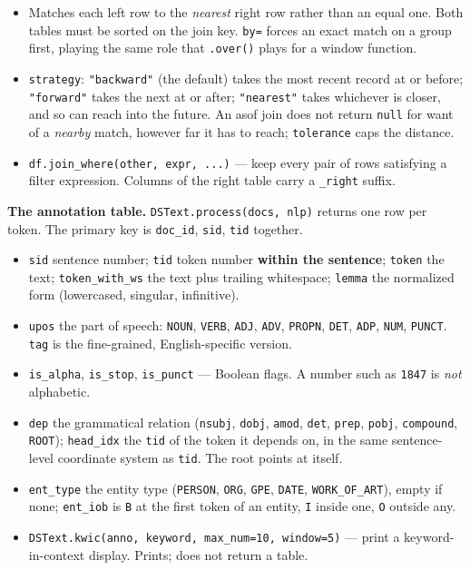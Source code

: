 \documentclass[11pt, a4paper]{article}
\newcommand{\code}[1]{\texttt{#1}}
\begin{document}
\begin{itemize}
  \item Matches each left row to the \textit{nearest} right row rather than an equal one. Both
        tables must be sorted on the join key. \code{by=} forces an exact match on a group
        first, playing the same role that \code{.over()} plays for a window function.
  \item \code{strategy}: \code{"backward"} (the default) takes the most recent record at or
        before; \code{"forward"} takes the next at or after; \code{"nearest"} takes whichever
        is closer, and so can reach into the future. An asof join does not return \code{null}
        for want of a \textit{nearby} match, however far it has to reach; \code{tolerance}
        caps the distance.
  \item \code{df.join\_where(other, expr, ...)} --- keep every pair of rows satisfying a
        filter expression. Columns of the right table carry a \code{\_right} suffix.
\end{itemize}

\smallskip

\textbf{The annotation table.}
\code{DSText.process(docs, nlp)} returns one row per token. The primary key is
\code{doc\_id}, \code{sid}, \code{tid} together.

\begin{itemize}
  \item \code{sid} sentence number; \code{tid} token number \textbf{within the sentence};
        \code{token} the text; \code{token\_with\_ws} the text plus trailing whitespace;
        \code{lemma} the normalized form (lowercased, singular, infinitive).
  \item \code{upos} the part of speech: \code{NOUN}, \code{VERB}, \code{ADJ}, \code{ADV},
        \code{PROPN}, \code{DET}, \code{ADP}, \code{NUM}, \code{PUNCT}. \code{tag} is the
        fine-grained, English-specific version.
  \item \code{is\_alpha}, \code{is\_stop}, \code{is\_punct} --- Boolean flags. A number such as
        \code{1847} is \textit{not} alphabetic.
  \item \code{dep} the grammatical relation (\code{nsubj}, \code{dobj}, \code{amod},
        \code{det}, \code{prep}, \code{pobj}, \code{compound}, \code{ROOT});
        \code{head\_idx} the \code{tid} of the token it depends on, in the same
        sentence-level coordinate system as \code{tid}. The root points at itself.
  \item \code{ent\_type} the entity type (\code{PERSON}, \code{ORG}, \code{GPE},
        \code{DATE}, \code{WORK\_OF\_ART}), empty if none; \code{ent\_iob} is \code{B} at the
        first token of an entity, \code{I} inside one, \code{O} outside any.
  \item \code{DSText.kwic(anno, keyword, max\_num=10, window=5)} --- print a keyword-in-context
        display. Prints; does not return a table.
\end{itemize}
\end{document}
